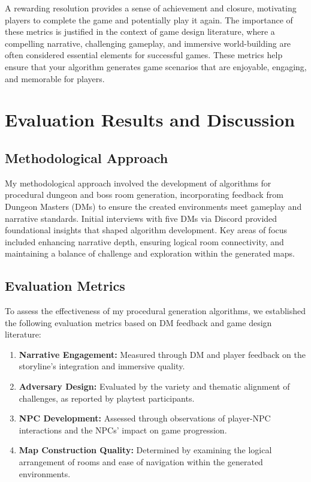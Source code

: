 \documentclass[10pt,twocolumn]{article}
\begin{document}
A rewarding resolution provides a sense of achievement and closure, motivating players to complete the game and potentially play it again.
The importance of these metrics is justified in the context of game design literature, where a compelling narrative, challenging gameplay, and immersive world-building are often considered essential elements for successful games. These metrics help ensure that your algorithm generates game scenarios that are enjoyable, engaging, and memorable for players.



\section{Evaluation Results and Discussion}

\subsection{Methodological Approach}

My methodological approach involved the development of algorithms for procedural dungeon and boss room generation, incorporating feedback from Dungeon Masters (DMs) to ensure the created environments meet gameplay and narrative standards. Initial interviews with five DMs via Discord provided foundational insights that shaped algorithm development. Key areas of focus included enhancing narrative depth, ensuring logical room connectivity, and maintaining a balance of challenge and exploration within the generated maps.

\subsection{Evaluation Metrics}

To assess the effectiveness of my procedural generation algorithms, we established the following evaluation metrics based on DM feedback and game design literature:

\begin{enumerate}
    \item \textbf{Narrative Engagement:} Measured through DM and player feedback on the storyline's integration and immersive quality.
    \item \textbf{Adversary Design:} Evaluated by the variety and thematic alignment of challenges, as reported by playtest participants.
    \item \textbf{NPC Development:} Assessed through observations of player-NPC interactions and the NPCs' impact on game progression.
    \item \textbf{Map Construction Quality:} Determined by examining the logical arrangement of rooms and ease of navigation within the generated environments.
\end{enumerate}
\end{document}
